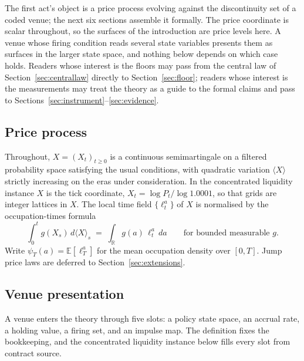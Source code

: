 \documentclass[11pt,a4paper]{article}
\theoremstyle{definition}
\theoremstyle{plain}
\theoremstyle{remark}
\begin{document}
The first act's object is a price process evolving against the discontinuity set of a coded venue; the next six sections assemble it formally. The price coordinate is scalar throughout, so the
surfaces of the introduction are price levels here. A venue whose firing condition reads several state variables presents them as surfaces in the larger state space, and nothing below depends on
which case holds. Readers whose interest is the floors may pass from the central law of Section~\ref{sec:centrallaw} directly to Section~\ref{sec:floor}; readers whose interest is the measurements 
may treat the theory as a guide to the formal claims and pass to Sections~\ref{sec:instrument}--\ref{sec:evidence}.

\subsection{Price process}\label{sec:price}

Throughout, $X = (X_t)_{t \ge 0}$ is a continuous semimartingale on a filtered probability space satisfying the usual conditions, with quadratic variation $\langle X \rangle$ strictly increasing on 
the eras under consideration. In the concentrated liquidity instance $X$ is the tick coordinate, $X_t = \log P_t / \log 1.0001$, so that grids are integer lattices in $X$. 
The local time field $\{\ell_t^a\}$ of $X$ is normalised by the occupation-times formula\cite{revuzyor}
\[
\int_0^t g(X_s)\, d\langle X \rangle_s
\;=\; \int_{\mathbb{R}} g(a)\, \ell_t^a\, da
\qquad\text{for bounded measurable } g.
\]
Write $\psi_T(a) =
\mathbb{E}[\ell_T^a]$ for the mean occupation density over $[0,T]$.
Jump price laws are deferred to Section~\ref{sec:extensions}.

\subsection{Venue presentation}\label{sec:venue}

A venue enters the theory through five slots: a policy state space, an accrual rate, a holding value, a firing set, and an impulse map. The definition fixes the bookkeeping, and the concentrated
liquidity instance below fills every slot from contract source.
\end{document}
